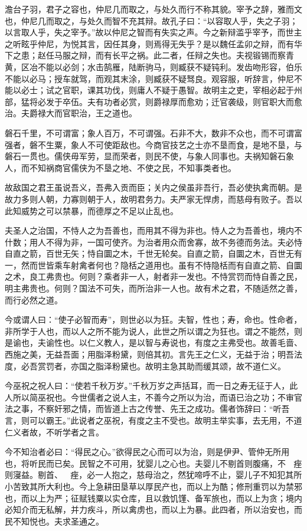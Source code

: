 \documentclass[]{article}
\begin{document}
澹台子羽，君子之容也，仲尼几而取之，与处久而行不称其貌。宰予之辞，雅而文也，仲尼几而取之，与处久而智不充其辩。故孔子曰：``以容取人乎，失之子羽；以言取人乎，失之宰予。''故以仲尼之智而有失实之声。今之新辩滥乎宰予，而世主之听眩乎仲尼，为悦其言，因任其身，则焉得无失乎？是以魏任孟卯之辩，而有华下之患；赵任马服之辩，而有长平之祸。此二者，任辩之失也。夫视锻锡而察青黄，区冶不能以必剑；水击鹄雁，陆断驹马，则臧获不疑钝利。发齿吻形容，伯乐不能以必马；授车就驾，而观其末涂，则臧获不疑驽良。观容服，听辞言，仲尼不能以必士；试之官职，课其功伐，则庸人不疑于愚智。故明主之吏，宰相必起于州部，猛将必发于卒伍。夫有功者必赏，则爵禄厚而愈劝；迁官袭级，则官职大而愈治。夫爵禄大而官职治，王之道也。

磐石千里，不可谓富；象人百万，不可谓强。石非不大，数非不众也，而不可谓富强者，磐不生粟，象人不可使距敌也。今商官技艺之士亦不垦而食，是地不垦，与磐石一贯也。儒侠毋军劳，显而荣者，则民不使，与象人同事也。夫祸知磐石象人，而不知祸商官儒侠为不垦之地、不使之民，不知事类者也。

故敌国之君王虽说吾义，吾弗入贡而臣；关内之侯虽非吾行，吾必使执禽而朝。是故力多则人朝，力寡则朝于人，故明君务力。夫严家无悍虏，而慈母有败子。吾以此知威势之可以禁暴，而德厚之不足以止乱也。

夫圣人之治国，不恃人之为吾善也，而用其不得为非也。恃人之为吾善也，境内不什数；用人不得为非，一国可使齐。为治者用众而舍寡，故不务德而务法。夫必恃自直之箭，百世无矢；恃自圜之木，千世无轮矣。自直之箭，自圜之木，百世无有一，然而世皆乘车射禽者何也？隐栝之道用也。虽有不恃隐栝而有自直之箭、自圜之术，良工弗贵也。何则？乘者非一人，射者非一发也。不恃赏罚而恃自善之民，明主弗贵也。何则？国法不可失，而所治非一人也。故有术之君，不随适然之善，而行必然之道。

今或谓人曰：``使子必智而寿''，则世必以为狂。夫智，性也；寿，命也。性命者，非所学于人也，而以人之所不能为说人，此世之所以谓之为狂也。谓之不能然，则是谕也，夫谕性也。以仁义教人，是以智与寿说也，有度之主弗受也。故善毛啬、西施之美，无益吾面；用脂泽粉黛，则倍其初。言先王之仁义，无益于治；明吾法度，必吾赏罚者，亦国之脂泽粉黛也。故明主急其助而缓其颂，故不道仁义。

今巫祝之祝人曰：``使若千秋万岁。''千秋万岁之声括耳，而一日之寿无征于人，此人所以简巫祝也。今世儒者之说人主，不善今之所以为治，而语已治之功；不审官法之事，不察奸邪之情，而皆道上古之传誉、先王之成功。儒者饰辞曰：``听吾言，则可以霸王。''此说者之巫祝，有度之主不受也。故明主举实事，去无用，不道仁义者故，不听学者之言。

今不知治者必曰：``得民之心。''欲得民之心而可以为治，则是伊尹、管仲无所用也，将听民而已矣。民智之不可用，犹婴儿之心也。夫婴儿不剔首则腹痛，不
 痤则寖益。剔首、 
痤，必一人抱之，慈母治之，然犹啼呼不止，婴儿子不知犯其所小苦致其所大利也。今上急耕田垦草以厚民产也，而以上为酷；修刑重罚以为禁邪也，而以上为严；征赋钱粟以实仓库，且以救饥馑、备军旅也，而以上为贪；境内必知介而无私解，并力疾斗，所以禽虏也，而以上为暴。此四者，所以治安也，而民不知悦也。夫求圣通之。
\end{document}
